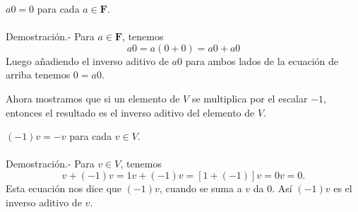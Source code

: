 \begin{myteo}
    $a0=0$ para cada $a\in \textbf{F}$.\\\\
	Demostración.-\; Para $a\in \textbf{F}$, tenemos 
	$$a0=a(0+0)=a0+a0$$
	Luego añadiendo el inverso aditivo de $a0$ para ambos lados de la ecuación de arriba tenemos $0=a0$. 
\end{myteo}
\vspace{0.3cm}

Ahora mostramos que si un elemento de $V$ se multiplica por el escalar $-1$, entonces el resultado es el inverso aditivo del elemento de $V$.\\

\begin{myteo}
    $(-1)v=-v$ para cada $v\in V$.\\\\
    	Demostración.-\; Para $v\in V$, tenemos
	$$v+(-1)v=1v+(-1)v=[1+(-1)]v=0v=0.$$
	Esta ecuación nos dice que $(-1)v$, cuando se suma a $v$ da $0$. Así $(-1)v$ es el inverso aditivo de $v$. 
\end{myteo}
\vspace{0.5cm}

\setcounter{mysection}{1}

